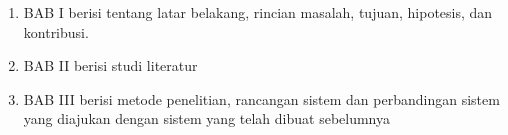 \begin{enumerate}
	\item BAB I berisi tentang latar belakang, rincian masalah, tujuan, hipotesis, dan kontribusi.
	\item BAB II berisi studi literatur 
	\item BAB III berisi metode penelitian, rancangan sistem dan perbandingan sistem yang diajukan dengan sistem yang telah dibuat sebelumnya
\end{enumerate}
 

\iflogTA
\else


\fi